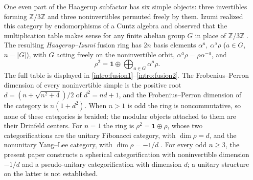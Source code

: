 \documentclass[11pt]{article}
\numberwithin{equation}{section}
\theoremstyle{definition}
\theoremstyle{remark}
\newcommand{\Z}{\mathbb Z}
\newcommand{\one}{\mathbf1}
\begin{document}
One even part of the Haagerup subfactor has six simple objects: three
invertibles forming $\Z/3\Z$ and three noninvertibles permuted freely by
them. Izumi realized this category by endomorphisms of a Cuntz algebra
and observed that the multiplication table makes sense for any finite
abelian group $G$ in place of $\Z/3\Z$ \cite{Izumi2}. The resulting
\emph{Haagerup--Izumi} fusion ring has $2n$ basis elements
$\alpha^a,\ \alpha^a\rho$ ($a\in G$, $n=|G|$), with $G$ acting
freely on the noninvertible orbit, $\alpha^a\rho=\rho\alpha^{-a}$, and
\[
 \rho^2=\one\oplus\bigoplus_{a\in G}\alpha^a\rho .
\]
The full table is displayed in
\eqref{intro:fusion1}--\eqref{intro:fusion2}. The Frobenius--Perron
dimension of every noninvertible simple is the positive root
$d=(n+\sqrt{n^2+4})/2$ of $d^2=nd+1$, and the Frobenius--Perron
dimension of the category is $n(1+d^2)$. When $n>1$ is odd the ring is
noncommutative, so none of these
categories is braided; the modular objects attached to them are their
Drinfeld centers. For $n=1$ the ring is $\rho^2=\one\oplus\rho$, whose
two categorifications are the unitary Fibonacci category, with
$\dim\rho=d$, and the nonunitary Yang--Lee category, with
$\dim\rho=-1/d$ \cite{Ostrik2}. For every odd $n\ge3$, the present
paper constructs a spherical categorification with noninvertible
dimension $-1/d$ and a pseudo-unitary categorification with dimension
$d$; a unitary structure on the latter is not established.
\end{document}
